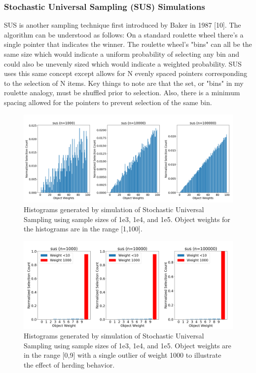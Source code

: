 \documentclass[12pt]{article}
\begin{document}
    \subsubsection{Stochastic Universal Sampling (SUS) Simulations}
    SUS is another sampling technique first introduced by Baker in 1987 [10].
    The algorithm can be understood as follows: On a standard roulette wheel
    there's a single pointer that indicates the winner. The roulette wheel's
    "bins" can all be the same size which would indicate a uniform probability
    of selecting any bin and could also be unevenly sized which would indicate
    a weighted probability. SUS uses this same concept except allows for N
    evenly spaced pointers corresponding to the selection of N items. Key
    things to note are that the set, or "bins" in my roulette analogy, must be
    shuffled prior to selection. Also, there is a minimum spacing allowed for
    the pointers to prevent selection of the same bin.

    \begin{figure}[h]
      \centering
      \includegraphics[scale=0.30]{images/herding_roullette.png} 
      \caption{Histograms generated by simulation of Stochastic Universal
               Sampling using sample sizes of 1e3, 1e4, and 1e5. Object weights
               for the histograms are in the range [1,100].}
      \label{fig:herding_roullette}
    \end{figure}

    \begin{figure}[h]
      \centering
      \includegraphics[scale=0.30]{images/pathological_roullette.png} 
      \caption{Histograms generated by simulation of Stochastic Universal
               Sampling using sample sizes of 1e3, 1e4, and 1e5. Object weights
               are in the range [0,9] with a single outlier of weight 1000 to
               illustrate the effect of herding behavior.}
      \label{fig:pathological_roullette}
    \end{figure}
\end{document}
